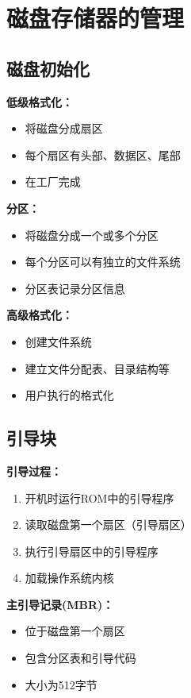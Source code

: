 \documentclass[lang=cn,newtx,10pt,scheme=chinese]{../../elegantbook}
\begin{document}
\section{磁盘存储器的管理}

\subsection{磁盘初始化}

\textbf{低级格式化：}
\begin{itemize}
  \item 将磁盘分成扇区
  \item 每个扇区有头部、数据区、尾部
  \item 在工厂完成
\end{itemize}

\textbf{分区：}
\begin{itemize}
  \item 将磁盘分成一个或多个分区
  \item 每个分区可以有独立的文件系统
  \item 分区表记录分区信息
\end{itemize}

\textbf{高级格式化：}
\begin{itemize}
  \item 创建文件系统
  \item 建立文件分配表、目录结构等
  \item 用户执行的格式化
\end{itemize}

\subsection{引导块}

\textbf{引导过程：}
\begin{enumerate}
  \item 开机时运行ROM中的引导程序
  \item 读取磁盘第一个扇区（引导扇区）
  \item 执行引导扇区中的引导程序
  \item 加载操作系统内核
\end{enumerate}

\textbf{主引导记录(MBR)：}
\begin{itemize}
  \item 位于磁盘第一个扇区
  \item 包含分区表和引导代码
  \item 大小为512字节
\end{itemize}
\end{document}
